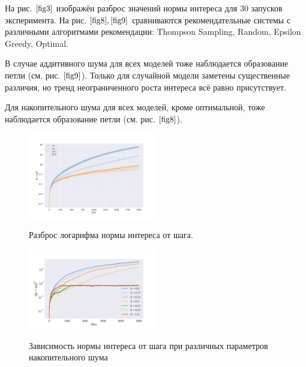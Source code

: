 \documentclass[12pt, twoside]{article}
\begin{document}

На рис.$~\ref{fig3}$ изображён разброс значений нормы интереса для 30 запусков эксперимента.
На рис.$~\ref{fig8},\ref{fig9}$ сравниваются рекомендательные системы с различными алгоритмами рекомендации: Thompson Sampling, Random, Epsilon Greedy, Optimal.

В случае аддитивного шума для всех моделей тоже наблюдается образование петли (см. рис.$~\ref{fig9}$). 
Только для случайной модели заметены существенные различия, но тренд неограниченного роста интереса всё равно присутствует.   


Для накопительного шума для всех моделей, кроме оптимальной, тоже наблюдается образование петли (см. рис.$~\ref{fig8}$). 

\begin{figure}[h]
  \begin{multicols}{2}
    \hfill
    \includegraphics[width=0.5\textwidth]{../figures/var_norm_interest.pdf}
    \hfill
    \caption{Разброс логарифма нормы интереса от шага.}
    \label{fig3}
    \hfill
    \includegraphics[width=0.5\textwidth]{../figures/winstreak_norm_interest.pdf}
    \caption{Зависимость нормы интереса от шага при различных параметров накопительного шума}
    \hfill
    \label{fig4}
  \end{multicols}
\end{figure}

\newpage
\end{document}
